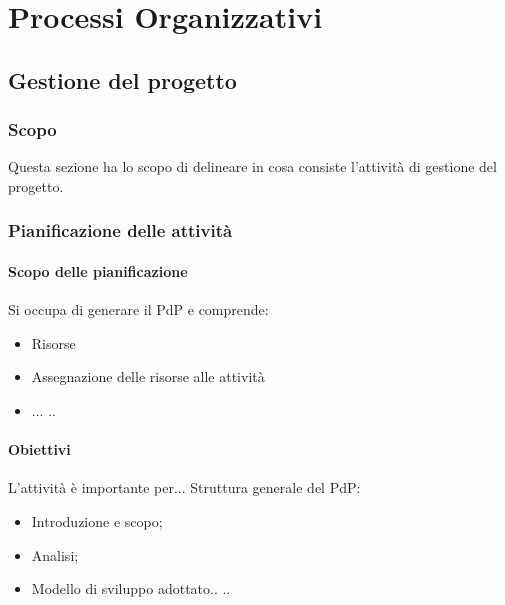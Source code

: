 \section{Processi Organizzativi}

	
    \subsection{Gestione del progetto}

	    \subsubsection{Scopo}
	    Questa sezione ha lo scopo di delineare in cosa consiste l'attività di gestione del progetto.  
	    
		
		\subsubsection{Pianificazione delle attività}
		
			\paragraph{Scopo delle pianificazione}
			Si occupa di generare il PdP e comprende:
			\begin{itemize}
				\item Risorse
				\item Assegnazione delle risorse alle attività
				\item ...
				..
			\end{itemize}
		
			\paragraph{Obiettivi}
			L'attività è importante per...
			Struttura generale del PdP:
			\begin{itemize}
				\item Introduzione e scopo;
				\item Analisi;
				\item Modello di sviluppo adottato..
				..
			\end{itemize}
		
